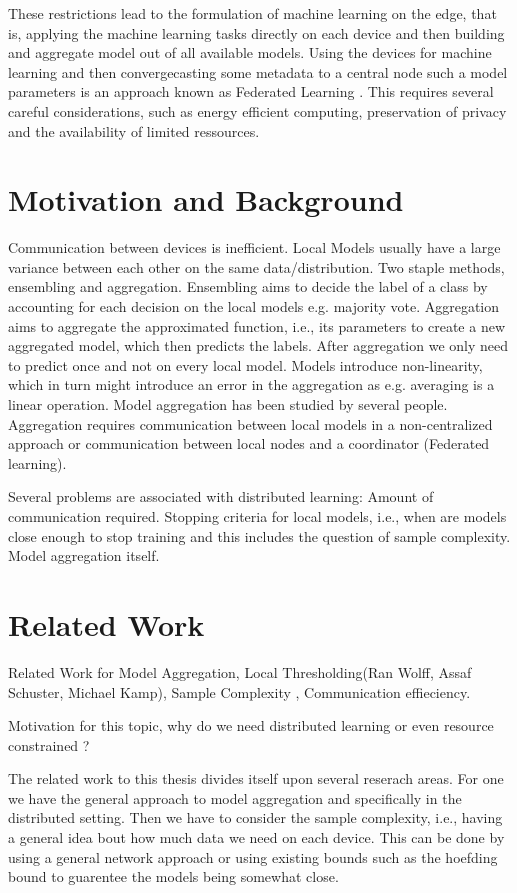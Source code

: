 These restrictions lead to the formulation of machine learning on the edge, that is, applying the machine learning tasks directly on each device and then building and aggregate model out of all available models.
Using the devices for machine learning and then convergecasting some metadata to a central node such a model parameters is an approach known as Federated Learning .
This requires several careful considerations, such as energy efficient computing, preservation of privacy and the availability of limited ressources.


\section{Motivation and Background}
Communication between devices is inefficient.
Local Models usually have a large variance between each other on the same data/distribution.
Two staple methods, ensembling and aggregation.
Ensembling aims to decide the label of a class by accounting for each decision on the local models e.g. majority vote.
Aggregation aims to aggregate the approximated function, i.e., its parameters to create a new aggregated model, which then predicts the labels.
After aggregation we only need to predict once and not on every local model.
Models introduce non-linearity, which in turn might introduce an error in the aggregation as e.g. averaging is a linear operation.
Model aggregation has been studied by several people.
Aggregation requires communication between local models in a non-centralized approach or communication between local nodes and a coordinator (Federated learning).

Several problems are associated with distributed learning:
Amount of communication required.
Stopping criteria for local models, i.e., when are models close enough to stop training and this includes the question of sample complexity.
Model aggregation itself.


\section{Related Work}
Related Work for Model Aggregation, Local Thresholding(Ran Wolff, Assaf Schuster, Michael Kamp), Sample Complexity , Communication effieciency.


Motivation for this topic, why do we need distributed learning or even resource constrained ?

The related work to this thesis divides itself upon several reserach areas. 
For one we have the general approach to model aggregation and specifically in the distributed setting.
Then we have to consider the sample complexity, i.e., having a general idea bout how much data we need on each device.
This can be done by using a general network approach or using existing bounds such as the hoefding bound to guarentee the models being somewhat close.

